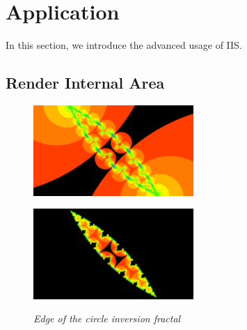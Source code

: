 

\section{Application}

In this section, we introduce the advanced usage of IIS.

\subsection{Render Internal Area}

\begin{figure}[htbp]
 \begin{minipage}[t]{0.5\hsize}
  \center
  \includegraphics[height=1.35in, keepaspectratio]{img/application/internal/schottky.png}
  \subcaption{\textit{}}
  \label{fig:schottkyAll}
  \hspace*{\fill}
 \end{minipage}
 \begin{minipage}[t]{0.5\hsize}
  \center
  \includegraphics[height=1.35in, keepaspectratio]{img/application/internal/schottkyEdge.png}
  \subcaption{\textit{}}
  \label{fig:schottkyEdge}
  \hspace*{\fill}
 \end{minipage}
 \caption{\textit{Edge of the circle inversion fractal}}
 \label{fig:schottkyDivide}
\end{figure}

